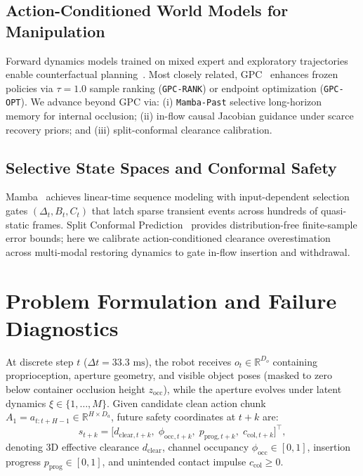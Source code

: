 \documentclass[letterpaper, 10pt, conference]{ieeeconf}
\begin{document}
\subsection{Action-Conditioned World Models for Manipulation}
Forward dynamics models trained on mixed expert and exploratory trajectories enable counterfactual planning~\cite{hafner2025dreamerv3, zhou2025dinowm, qi2026gpc}. Most closely related, GPC~\cite{qi2026gpc} enhances frozen policies via $\tau=1.0$ sample ranking (\texttt{GPC-RANK}) or endpoint optimization (\texttt{GPC-OPT}). We advance beyond GPC via: (i) \texttt{Mamba-Past} selective long-horizon memory for internal occlusion; (ii) in-flow causal Jacobian guidance under scarce recovery priors; and (iii) split-conformal clearance calibration.

\subsection{Selective State Spaces and Conformal Safety}
Mamba~\cite{gu2024mamba} achieves linear-time sequence modeling with input-dependent selection gates $(\Delta_t, B_t, C_t)$ that latch sparse transient events across hundreds of quasi-static frames. Split Conformal Prediction~\cite{angelopoulos2023conformal, lindemann2023conformal} provides distribution-free finite-sample error bounds; here we calibrate action-conditioned clearance overestimation across multi-modal restoring dynamics to gate in-flow insertion and withdrawal.

\section{Problem Formulation and Failure Diagnostics}

At discrete step $t$ ($\Delta t = 33.3\text{ ms}$), the robot receives $o_t \in \mathbb{R}^{D_o}$ containing proprioception, aperture geometry, and visible object poses (masked to zero below container occlusion height $z_{\text{occ}}$), while the aperture evolves under latent dynamics $\xi \in \{1, \dots, M\}$. Given candidate clean action chunk $A_1 = a_{t:t+H-1} \in \mathbb{R}^{H \times D_a}$, future safety coordinates at $t+k$ are:
\begin{equation}
    s_{t+k} = \big[d_{\text{clear}, t+k},\; \phi_{\text{occ}, t+k},\; p_{\text{prog}, t+k},\; c_{\text{col}, t+k}\big]^\top,
\end{equation}
denoting 3D effective clearance $d_{\text{clear}}$, channel occupancy $\phi_{\text{occ}} \in [0,1]$, insertion progress $p_{\text{prog}} \in [0,1]$, and unintended contact impulse $c_{\text{col}} \ge 0$.
\end{document}
